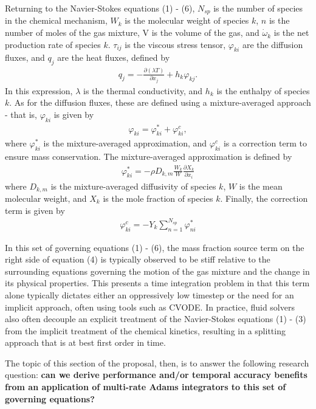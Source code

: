 Returning to the Navier-Stokes equations (1) - (6), $N_{sp}$ is the number of species in the chemical mechanism,
$W_{k}$ is the molecular weight of species $k$, $n$ is the number of moles of the gas mixture, V is the volume
of the gas, and $\dot{\omega}_{k}$ is the net production rate of species $k$. $\tau_{ij}$ is the viscous stress
tensor, $\varphi_{ki}$ are the diffusion fluxes, and $q_{j}$ are the heat fluxes, defined by
\begin{align}
q_{j} = - \frac{\partial (\lambda T)}{\partial x_{j}} + h_{k}\varphi_{kj}.
\end{align}
In this expression, $\lambda$ is the thermal conductivity, and $h_{k}$ is the enthalpy of species $k$.
As for the diffusion fluxes, these are defined using a mixture-averaged approach - that is, $\varphi_{ki}$
is given by
\begin{align}
\varphi_{ki} = \varphi_{ki}^{*} + \varphi_{ki}^{c},
\end{align}
where $\varphi_{ki}^{*}$ is the mixture-averaged approximation, and $\varphi_{ki}^{c}$
is a correction term to ensure mass conservation. The mixture-averaged approximation
is defined by
\begin{align}
\varphi_{ki}^{*} = -\rho D_{k,m}\frac{W_{k}}{W} \frac{\partial X_{k}}{\partial x_{i}}
\end{align}
where $D_{k,m}$ is the mixture-averaged diffusivity of species $k$, $W$ is the mean
molecular weight, and $X_{k}$ is the mole fraction of species $k$. Finally, the
correction term is given by
\begin{align}
\varphi_{ki}^{c} = -Y_{k} \sum_{n=1}^{N_{sp}} \varphi_{ni}^{*}
\end{align}

In this set of governing equations (1) - (6), the mass fraction source term
on the right side of equation (4) is typically observed to be stiff relative
to the surrounding equations governing the motion of the gas mixture and the change
in its physical properties. This presents a time integration problem in that this term
alone typically dictates either an oppressively low timestep or the need for
an implicit approach, often using tools such as CVODE. In practice, fluid solvers
also often decouple an explicit treatment of the Navier-Stokes equations (1) - (3)
from the implicit treatment of the chemical kinetics, resulting in a splitting
approach that is at best first order in time.

The topic of this section of the proposal, then, is to answer the following
research question: \textbf{can we derive performance and/or temporal accuracy benefits
from an application of multi-rate Adams integrators to this set of governing
equations?}

